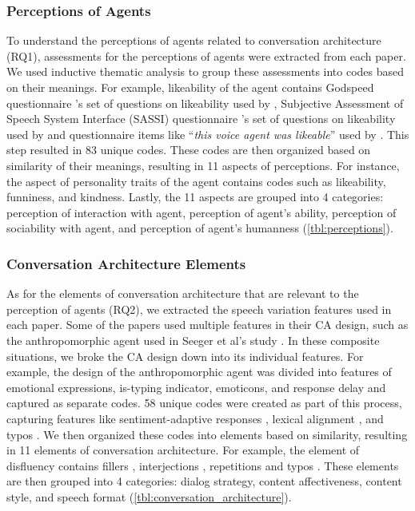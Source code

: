 \subsubsection*{Perceptions of Agents} To understand the perceptions of agents related to conversation architecture (RQ1), assessments for the perceptions of agents were extracted from each paper. We used inductive thematic analysis to group these assessments into codes based on their meanings. For example, likeability of the agent contains Godspeed questionnaire \cite{bartneck2009measurement}'s set of questions on likeability used by \cite{linnemann2018can}\cmt{[15]}, Subjective Assessment of Speech System Interface (SASSI) questionnaire \cite{hone2000towards}'s set of questions on likeability used by \cite{chan2021kinvoices, choi2020nobody}\cmt{[74][54]} and questionnaire items like ``\textit{this voice agent was likeable}'' used by \cite{cuadra2021my}\cmt{[67]}. This step resulted in 83 unique codes. These codes are then organized based on similarity of their meanings, resulting in 11 aspects of perceptions. For instance, the aspect of personality traits of the agent contains codes such as likeability, funniness, and kindness. Lastly, the 11 aspects are grouped into 4 categories: perception of interaction with agent, perception of agent's ability, perception of sociability with agent, and perception of agent's humanness (\autoref{tbl:perceptions}).

\subsubsection*{Conversation Architecture Elements}
As for the elements of conversation architecture that are relevant to the perception of agents (RQ2), we extracted the speech variation features used in each paper. Some of the papers used multiple features in their CA design, such as the anthropomorphic agent used in Seeger et al's study \cite{seeger2021chatbots}\cmt{[35]}. In these composite situations, we broke the CA design down into its individual features. For example, the design of the anthropomorphic agent \cite{seeger2021chatbots}\cmt{[35]} was divided into features of emotional expressions, is-typing indicator, emoticons, and response delay and captured as separate codes. 58 unique codes were created as part of this process, capturing features like sentiment-adaptive responses \cite{diederich2019emulating}\cmt{[25]}, lexical alignment \cite{spillner2021talk}\cmt{[18]}, and typos \cite{westerman2019believe}\cmt{[9]}. We then organized these codes into elements based on similarity, resulting in 11 elements of conversation architecture. For example, the element of disfluency contains fillers \cite{jeong2019exploring, wester2015artificial}\cmt{[10][14]}, interjections \cite{ceha2022expressive, hu2021enhancing}\cmt{[77][56]}, repetitions \cite{yang2021effect}\cmt{[72]} and typos \cite{westerman2019believe}\cmt{[9]}. These elements are then grouped into 4 categories: dialog strategy, content affectiveness, content style, and speech format (\autoref{tbl:conversation_architecture}).


